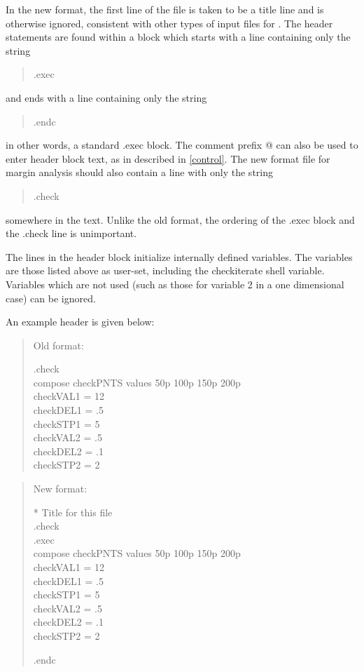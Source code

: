 In the new format, the first line of the file is taken to be a title
line and is otherwise ignored, consistent with other types of input files
for {\WRspice}.  The header statements are found within a block which
starts with a line containing only the string
\begin{quote}
{\vt .exec}
\end{quote}
and ends with a line containing only the string
\begin{quote}
{\vt .endc}
\end{quote}
in other words, a standard {\vt .exec} block.  The comment prefix
{\vt *@} can also be used to enter header block text, as in described
in \ref{control}.  The new format file for margin analysis should also
contain a line with only the string
\begin{quote}
{\vt .check}
\end{quote}
somewhere in the text.  Unlike the old format, the ordering of the
{\vt .exec block} and the {\vt .check} line is unimportant.

The lines in the header block initialize internally defined variables.  The
variables are those listed above as user-set, including the
{\et checkiterate} shell variable.  Variables which are not used (such as
those for variable 2 in a one dimensional case) can be ignored.

An example header is given below:\\
\begin{quote}
Old format:\\
{\raggedright\vt
.check\\
compose checkPNTS values 50p 100p 150p 200p\\
checkVAL1 = 12\\
checkDEL1 = .5\\
checkSTP1 = 5\\
checkVAL2 = .5\\
checkDEL2 = .1\\
checkSTP2 = 2\\}
\end{quote}
\begin{quote}
New format:\\
{\raggedright\vt
* Title for this file\\
.check\\
.exec\\
compose checkPNTS values 50p 100p 150p 200p\\
checkVAL1 = 12\\
checkDEL1 = .5\\
checkSTP1 = 5\\
checkVAL2 = .5\\
checkDEL2 = .1\\
checkSTP2 = 2\\}
.endc\\
\end{quote}

